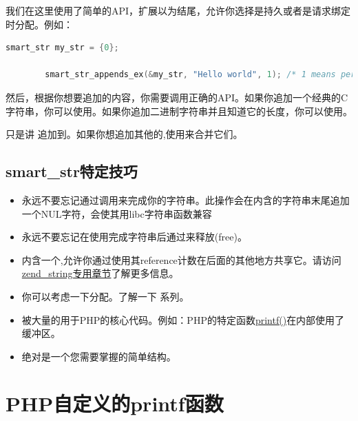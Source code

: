 我们在这里使用了简单的API，扩展以为结尾，允许你选择是持久或者是请求绑定时分配。例如：

\begin{lstlisting}[language=c]
        smart_str my_str = {0};

        smart_str_appends_ex(&my_str, "Hello world", 1); /* 1 means persistent allocation */
\end{lstlisting} 

然后，根据你想要追加的内容，你需要调用正确的API。如果你追加一个经典的C字符串，你可以使用。如果你追加二进制字符串并且知道它的长度，你可以使用。

只是讲 追加到。如果你想追加其他的,使用来合并它们。

\subsection{smart\_str特定技巧}

\begin{itemize}
        \item 永远不要忘记通过调用来完成你的字符串。此操作会在内含的字符串末尾追加一个NUL字符，会使其用libc字符串函数兼容
        \item 永远不要忘记在使用完成字符串后通过来释放(free)。
        \item {}内含一个,允许你通过使用其reference计数在后面的其他地方共享它。请访问\href{http://www.phpinternalsbook.com/php7/internal_types/strings/zend_strings.html}{zend\_string专用章节}了解更多信息。
        \item 你可以考虑一下分配。了解一下 系列。
        \item {}被大量的用于PHP的核心代码。例如：PHP的特定函数\href{http://www.phpinternalsbook.com/php7/internal_types/strings/printing_functions.html}{printf()}在内部使用了缓冲区。
        \item {}绝对是一个您需要掌握的简单结构。
\end{itemize}  


\section{PHP自定义的printf函数}









































